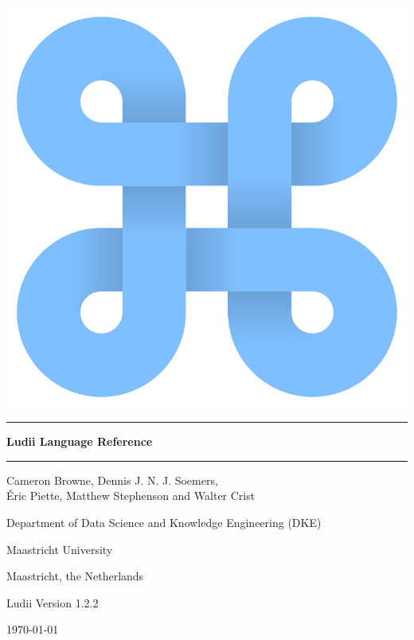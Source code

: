 \documentclass[10pt,twoside]{report}
\begin{document}
\texttt{\hyphenchar{} }

\thispagestyle{empty}

\begin{centering}

\includegraphics[scale=0.35]{figs/ludii-icon-1.pdf}


\vspace{30mm}
\noindent\rule{14.5cm}{0.5pt}

\vspace{5mm}
{\Huge \bf Ludii Language Reference}

\vspace{2mm}
\noindent\rule{14.5cm}{0.5pt}
 
 
\vspace{10mm}
{\Large Cameron Browne, Dennis J. N. J. Soemers,\\ {\'E}ric Piette, Matthew Stephenson and Walter Crist}

\vspace{10mm}
{\large Department of Data Science and Knowledge Engineering (DKE)}
 
\vspace{1mm}
{\large Maastricht University}

\vspace{1mm}
{\large Maastricht, the Netherlands}

\vspace{10mm}
{\large Ludii Version 1.2.2}

\vspace{1mm}
{\large \today}

\pagebreak

\end{centering}
\end{document}
